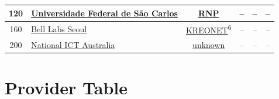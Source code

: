 \begin{small}
\begin{center}
\begin{longtable}{|c|c|c|c|c|c|}
 120 & \multicolumn{1}{|l|}{\index{Universidade Federal de São Carlos}\index{Site!Universidade Federal de São Carlos}\hyperref[sec:UFSCAR]{Universidade Federal de São Carlos}} & \href{https://www.rnp.br}{RNP} & – & – & – \\ \hline
 160 & \multicolumn{1}{|l|}{\index{Bell Labs Seoul}\index{Site!Bell Labs Seoul}\hyperref[sec:BLS]{Bell Labs Seoul}} & \href{http://www.kreonet.net}{KREONET}\textsuperscript{6} & – & – & – \\ \hline
 200 & \multicolumn{1}{|l|}{\index{National ICT Australia}\index{Site!National ICT Australia}\hyperref[sec:NICTA]{National ICT Australia}} & \href{}{unknown} & – & – & – \\ \hline
\end{longtable}
\end{center}
\end{small}




\chapter{Provider Table}
\label{cha:Providers}


